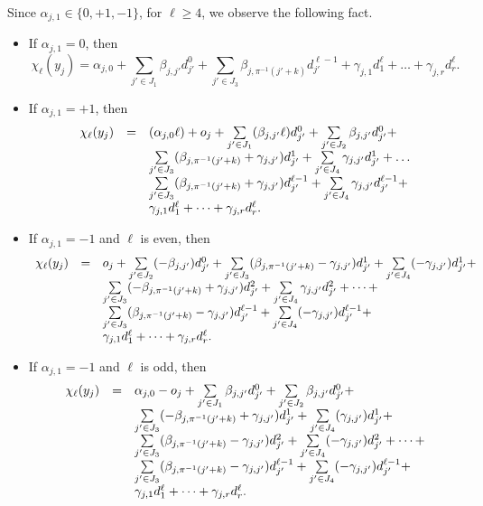 \documentclass[runningheads,a4paper]{llncs}
\begin{document}
Since $\alpha_{j,1} \in \{0,+1,-1\}$, for $\ell \ge 4$, we observe the following fact.
\begin{itemize}
\item If $\alpha_{j,1}=0$, then
\[\chi_\ell(y_j)=\alpha_{j,0}+ \sum \limits_{j' \in J_1} \beta_{j,j'} d^0_{j'}+ \sum \limits_{j' \in J_3} \beta_{j, \pi^{-1}(j'+k)} d^{\ell-1}_{j'} +\gamma_{j, 1} d^\ell_{1} + \dots + \gamma_{j,r} d^\ell_{r}.\]
%
\item If $\alpha_{j,1}=+1$, then 
\[
\begin{array}{l c l}
\chi_\ell(y_j)  & = & (\alpha_{j,0}\ell) + o_j +  \sum \limits_{j' \in J_1} (\beta_{j,j'} \ell) d^0_{j'} + \sum \limits_{j' \in J_2} \beta_{j,j'} d^0_{j'} + \\
& &   \sum \limits_{j' \in J_3} (\beta_{j, \pi^{-1}(j'+k)}+\gamma_{j,j'}) d^1_{j'} +  \sum \limits_{j' \in J_4} \gamma_{j,j'} d^1_{j'} + \dots  \\
& &  \sum \limits_{j' \in J_3} (\beta_{j, \pi^{-1}(j'+k)}+ \gamma_{j,j'}) d^{\ell-1}_{j'} +  \sum \limits_{j' \in J_4} \gamma_{j,j'} d^{\ell-1}_{j'} + \\
& & \gamma_{j, 1} d^\ell_{1} + \dots + \gamma_{j,r} d^\ell_{r}.
\end{array} 
\]
%
\item If $\alpha_{j,1}=-1$ and $\ell$ is even, then
\[
\begin{array}{l c l}
\chi_\ell(y_j)  & = & o_j +  \sum \limits_{j' \in J_2} (-\beta_{j,j'}) d^0_{j'} +  \sum \limits_{j' \in J_3} (\beta_{j, \pi^{-1}(j'+k)} - \gamma_{j,j'}) d^1_{j'} + \sum \limits_{j' \in J_4} (-\gamma_{j,j'}) d^1_{j'} + \\
& &  \sum \limits_{j' \in J_3} (-\beta_{j, \pi^{-1}(j'+k)}+ \gamma_{j,j'}) d^2_{j'} +   \sum \limits_{j' \in J_4} \gamma_{j,j'} d^2_{j'} + \dots + \\
& & \sum \limits_{j' \in J_3} (\beta_{j, \pi^{-1}(j'+k)} - \gamma_{j,j'}) d^{\ell-1}_{j'} +  \sum \limits_{j' \in J_4} (- \gamma_{j,j'}) d^{\ell-1}_{j'} + \\
& & \gamma_{j, 1} d^\ell_{1} + \dots + \gamma_{j,r} d^\ell_{r}.
\end{array} 
\]
\item If $\alpha_{j,1}=-1$ and $\ell$ is odd, then
\[
\begin{array}{l c l}
\chi_\ell(y_j)  & = & \alpha_{j,0}  - o_j +  \sum \limits_{j' \in J_1} \beta_{j,j'} d^0_{j'} +  \sum \limits_{j' \in J_2} \beta_{j,j'} d^0_{j'} +  \\
& & \sum \limits_{j' \in J_3} (-\beta_{j, \pi^{-1}(j'+k)}+\gamma_{j,j'}) d^1_{j'} + \sum \limits_{j' \in J_4} (\gamma_{j,j'}) d^1_{j'} + \\
& &  \sum \limits_{j' \in J_3} (\beta_{j, \pi^{-1}(j'+k)} - \gamma_{j,j'}) d^2_{j'} +  \sum \limits_{j' \in J_4} (-\gamma_{j,j'}) d^2_{j'} + \dots + \\
& & \sum \limits_{j' \in J_3} (\beta_{j, \pi^{-1}(j'+k)}-\gamma_{j,j'}) d^{\ell-1}_{j'} +  \sum \limits_{j' \in J_4} (-\gamma_{j,j'}) d^{\ell-1}_{j'} + \\
& & \gamma_{j, 1} d^\ell_{1} + \dots + \gamma_{j,r} d^\ell_{r}.
\end{array} 
\]
\end{itemize}
\end{document}
